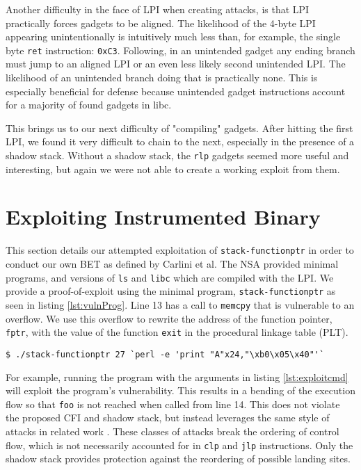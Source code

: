 \documentclass[conference,compsoc]{IEEEtran}
\begin{document}
Another difficulty in the face of LPI when creating attacks, is that LPI practically forces gadgets to be aligned. The likelihood of the 4-byte LPI appearing unintentionally is intuitively much less than, for example, the single byte \texttt{ret} instruction: \texttt{0xC3}. Following, in an unintended gadget any ending branch must jump to an aligned LPI or an even less likely second unintended LPI. The likelihood of an unintended branch doing that is practically none. This is especially beneficial for defense because unintended gadget instructions account for a majority of found gadgets in libc\cite{bletsch2011jump}.

This brings us to our next difficulty of "compiling" gadgets. After hitting the first LPI, we found it very difficult to chain to the next, especially in the presence of a shadow stack. Without a shadow stack, the \texttt{rlp} gadgets seemed more useful and interesting, but again we were not able to create a working exploit from them.


\section{Exploiting Instrumented Binary}\label{sec:exploit}

This section details our attempted exploitation of \texttt{stack-functionptr} in order to conduct our own BET as defined by Carlini et al. The NSA provided minimal programs, and versions of \texttt{ls} and \texttt{libc} which are compiled with the LPI\cite{NSAGitHub}. We provide a proof-of-exploit using the minimal program, \texttt{stack-functionptr} as seen in listing \ref{lst:vulnProg}. Line 13 has a call to \texttt{memcpy} that is vulnerable to an overflow. We use this overflow to rewrite the address of the function pointer, \texttt{fptr}, with the value of the function \texttt{exit} in the procedural linkage table (PLT).

\begin{lstlisting}[caption={Program exploit}, label={lst:exploitcmd}]
$ ./stack-functionptr 27 `perl -e 'print "A"x24,"\xb0\x05\x40"'`
\end{lstlisting}

For example, running the program with the arguments in listing \ref{lst:exploitcmd} will exploit the program's vulnerability. This results in a bending of the execution flow so that \texttt{foo} is not reached when called from line 14. This does not violate the proposed CFI and shadow stack, but instead leverages the same style of attacks in related work \cite{carlini,evans}. These classes of attacks break the ordering of control flow, which is not necessarily accounted for in \texttt{clp} and \texttt{jlp} instructions. Only the shadow stack provides protection against the reordering of possible landing sites.
\end{document}

